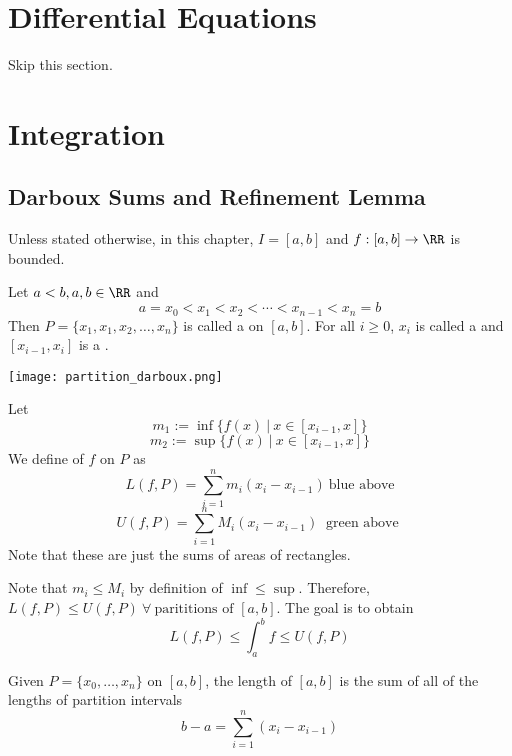 \documentclass[12pt]{scrartcl}
\begin{document}
\section{Differential Equations}

Skip this section.

\section{Integration}

\subsection{Darboux Sums and Refinement Lemma}

\begin{remark}
  Unless stated otherwise, in this chapter, $I = [a,b]$ 
  and $f: [a,b] \to \RR$ is bounded.
\end{remark}

\begin{definition}
  Let $a < b, a, b \in \RR$ and 
  \[a = x_0 < x_1 < x_2 < \cdots < x_{n-1} < x_n = b\]
  Then $P = \{x_1, x_1, x_2, \ldots, x_n\}$ is called a 
   on $[a,b]$. For all $i \geq 0$, 
  $x_i$ is called a  and $[x_{i-1}, x_i]$
  is a .
\end{definition}

\texttt{[image: partition\_darboux.png]}

\begin{definition}
  Let
  \[m_1 := \inf\{f(x) \ | \ x \in [x_{i-1}, x]\}\]
  \[m_2 := \sup\{f(x) \ | \ x \in [x_{i-1}, x]\}\]
  We define  of $f$ on $P$ as 
  \[L(f, P) = \sum_{i=1}^n m_i (x_i - x_{i-1}) \ \text{blue above}\]
  \[U(f, P) = \sum_{i=1}^n M_i(x_i - x_{i-1}) \ \text{ green above }\]
Note that these are just the sums of areas of rectangles.
\end{definition}

\begin{note}
  Note that $m_i \leq M_i$ by definition of $\inf \leq \sup$. 
  Therefore, $L(f, P) \leq U(f, P) \ \forall \ \text{parititions of } [a,b]$. 
  The goal is to obtain 
  \[L(f, P) \leq \int_a^b f \leq U(f, P)\]
\end{note}

\begin{note}
  Given $P = \{x_0, \ldots, x_n\}$ on $[a,b]$, the 
  length of $[a,b]$ is the sum of all of the lengths of partition 
  intervals 
  \[b-a = \sum_{i=1}^n (x_i - x_{i-1})\]
\end{note}
\end{document}
